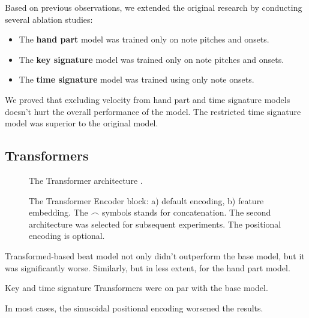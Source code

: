 \documentclass[a4paper, 9pt]{beamer}
\begin{document}
\begin{frame}Based on previous observations, we extended the original research by conducting several ablation studies:\pause \begin{itemize}
	\item The \textbf{hand part} model was trained only on note pitches and onsets.\pause
	\item The \textbf{key signature} model was trained only on note pitches and onsets.\pause
	\item The \textbf{time signature} model was trained using only note onsets.\pause
\end{itemize}

We proved that excluding velocity from hand part and time signature models doesn't hurt the overall performance of the model.  The restricted time signature model was superior to the original model.
\end{frame}

\subsection{Transformers}

\begin{frame}
\begin{figure}[ht!]
\centering
\resizebox{!}{0.8\textheight}{}
\caption[The Transformer architecture.]{The Transformer architecture \cite{Vaswani2017}.}
\end{figure}
\end{frame}

\begin{frame}
\begin{figure}[ht!]
\centering
{}
\caption[The Transformer Encoder block.]{The Transformer Encoder block: a) default encoding, b) feature embedding. The $\frown$ symbols stands for concatenation. The second architecture was selected for subsequent experiments. The positional encoding is optional.}
\label{vanilla_transformer_encoder_with_embedding}
\end{figure}
\end{frame}

\begin{frame}
Transformed-based beat model not only didn't outperform the base model, but it was significantly worse. Similarly, but in less extent, for the hand part model.\pause

Key and time signature Transformers were on par with the base model.\pause

In most cases, the sinusoidal positional encoding worsened the results.
\end{frame}
\end{document}
